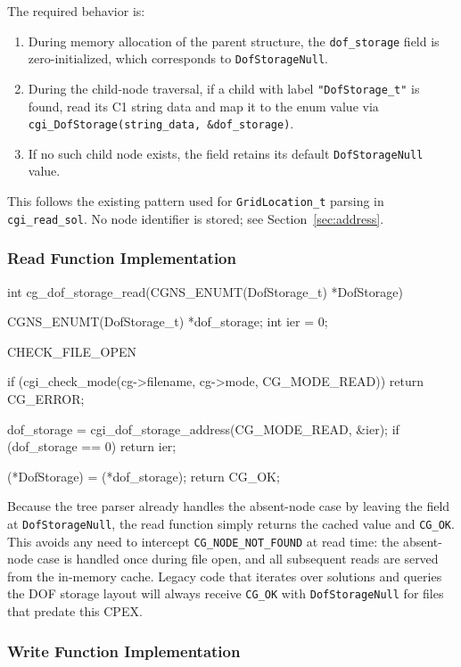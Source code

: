 \documentclass[11pt,letterpaper]{article}
\makeatletter
\let\cgns@orig@lstlisting\lstlisting
\let\cgns@endorig@lstlisting\endlstlisting
\renewenvironment{lstlisting}
  {\par\needspace{5\baselineskip}\nolinenumbers\cgns@orig@lstlisting}
  {\cgns@endorig@lstlisting\par\linenumbers}
\makeatother
\begin{document}
The required behavior is:

\begin{enumerate}[leftmargin=2em]
\item During memory allocation of the parent structure, the
  \texttt{dof\_storage} field is zero-initialized, which corresponds
  to \texttt{DofStorageNull}.
\item During the child-node traversal, if a child with label
  \texttt{"DofStorage\_t"} is found, read its C1 string
  data and map it to the enum value via
  \texttt{cgi\_DofStorage(string\_data, \&dof\_storage)}.
\item If no such child node exists, the field retains its default
  \texttt{DofStorageNull} value.
\end{enumerate}

This follows the existing pattern used for \texttt{GridLocation\_t}
parsing in \texttt{cgi\_read\_sol}.  No node identifier is stored;
see Section~\ref{sec:address}.

\subsubsection{Read Function Implementation}

\begin{lstlisting}[language=C]
int cg_dof_storage_read(CGNS_ENUMT(DofStorage_t) *DofStorage)
{
    CGNS_ENUMT(DofStorage_t) *dof_storage;
    int ier = 0;

    CHECK_FILE_OPEN

    if (cgi_check_mode(cg->filename, cg->mode, CG_MODE_READ))
        return CG_ERROR;

    dof_storage = cgi_dof_storage_address(CG_MODE_READ, &ier);
    if (dof_storage == 0) return ier;

    (*DofStorage) = (*dof_storage);
    return CG_OK;
}
\end{lstlisting}

Because the tree parser already handles the absent-node case by leaving
the field at \texttt{DofStorageNull}, the read function simply returns
the cached value and \texttt{CG\_OK}.  This avoids any need to intercept
\texttt{CG\_NODE\_NOT\_FOUND} at read time: the absent-node case is
handled once during file open, and all subsequent reads are served from
the in-memory cache.  Legacy code that iterates over solutions and
queries the DOF storage layout will always receive \texttt{CG\_OK} with
\texttt{DofStorageNull} for files that predate this CPEX.

\subsubsection{Write Function Implementation}
\end{document}

